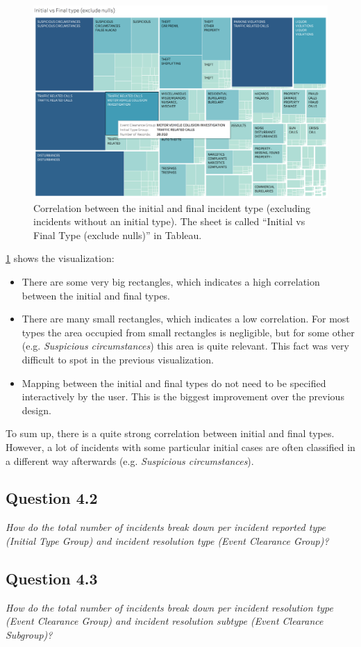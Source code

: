 \begin{figure}[h]
	\centering
	\includegraphics[width=\columnwidth]{figures/4_1_initial_vs_final_group_treemap}
	\caption{Correlation between the initial and final incident type (excluding incidents without an initial type). The sheet is called ``Initial vs Final Type (exclude nulls)'' in Tableau.}
	\label{fig:4_1_initial_vs_final_group_treemap}
\end{figure}

\cref{fig:4_1_initial_vs_final_group_treemap} shows the visualization:
\begin{itemize}
	\item There are some very big rectangles, which indicates a high correlation between the initial and final types.
	\item There are many small rectangles, which indicates a low correlation. For most types the area occupied from small rectangles is negligible, but for some other (e.g. \textit{Suspicious circumstances}) this area is quite relevant. This fact was very difficult to spot in the previous visualization.
	\item Mapping between the initial and final types do not need to be specified interactively by the user. This is the biggest improvement over the previous design.
\end{itemize}

To sum up, there is a quite strong correlation between initial and final types.
However, a lot of incidents with some particular initial cases are often classified in a different way afterwards (e.g. \textit{Suspicious circumstances}).


\subsection*{Question 4.2}
\textit{How do the total number of incidents break down per incident reported type (Initial Type Group) and incident resolution type (Event Clearance Group)?}


\subsection*{Question 4.3}
\textit{How do the total number of incidents break down per incident resolution type (Event Clearance Group) and incident resolution subtype (Event Clearance Subgroup)?}
